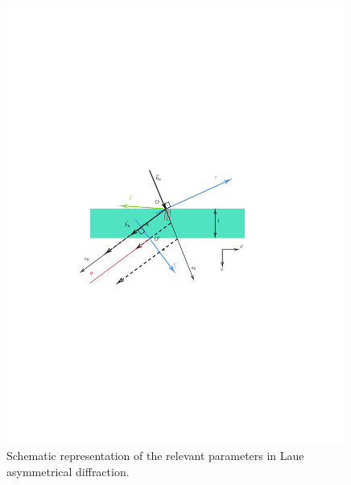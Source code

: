 \documentclass[preprint]{iucr}              %
\begin{document}
\begin{figure}
\label{fig:laue}
\caption{Schematic representation of the relevant parameters in Laue asymmetrical diffraction.
}
\includegraphics[width=0.99\textwidth,trim=3cm 10cm 5cm 10cm,clip=true]{fig3.pdf}
\end{figure}

\end{document}
